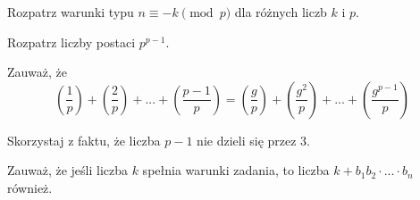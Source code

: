
\begin{hints_list}
	\item *
	\item Rozpatrz warunki typu $n \equiv -k \pmod{p}$ dla różnych liczb $k$ i $p$.
	\item Rozpatrz liczby postaci $p^{p - 1}$.
	\item Zauważ, że 
\[
		\left(\frac{1}{p}\right) + 
		\left(\frac{2}{p}\right) + 
		... +
		\left(\frac{p - 1}{p}\right) =
		\left(\frac{g}{p}\right) + 
		\left(\frac{g^2}{p}\right) + 
		... +
		\left(\frac{g^{p - 1}}{p}\right)
\]
	\item Skorzystaj z faktu, że liczba $p - 1$ nie dzieli się przez $3$.
	\item Zauważ, że jeśli liczba $k$ spełnia warunki zadania, to liczba $k + b_1b_2\cdot ... \cdot b_n$ również.
\end{hints_list}